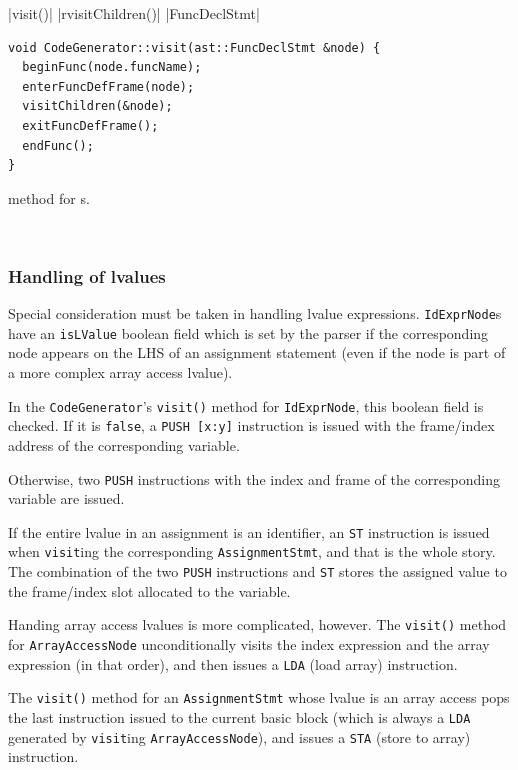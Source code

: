 \documentclass[11pt,a4paper]{scrartcl}
\begin{document}
|visit()|
|rvisitChildren()|
|FuncDeclStmt|
\begin{lstfloat}

\begin{verbatim}
void CodeGenerator::visit(ast::FuncDeclStmt &node) {
  beginFunc(node.funcName);
  enterFuncDefFrame(node);
  visitChildren(&node);
  exitFuncDefFrame();
  endFunc();
}
\end{verbatim}
  \caption{\protect{} method for \protect{}s.}~\label{lst:codegen-example-2}
\end{lstfloat}

\subsubsection{Handling of lvalues}

Special consideration must be taken in handling lvalue expressions. \verb|IdExprNode|s have an \verb|isLValue| boolean field which is set by the parser if the corresponding node appears on the LHS of an assignment statement (even if the node is part of a more complex array access lvalue).

In the \verb|CodeGenerator|'s \verb|visit()| method for \verb|IdExprNode|, this boolean field is checked. If it is \verb|false|, a \verb|PUSH [x:y]| instruction is issued with the frame/index address of the corresponding variable.

Otherwise, two \verb|PUSH| instructions with the index and frame of the corresponding variable are issued.

If the entire lvalue in an assignment is an identifier, an \verb|ST| instruction is issued when \verb|visit|ing the corresponding \verb|AssignmentStmt|, and that is the whole story. The combination of the two \verb|PUSH| instructions and \verb|ST| stores the assigned value to the frame/index slot allocated to the variable.

Handing array access lvalues is more complicated, however. The \verb|visit()| method for \verb|ArrayAccessNode| unconditionally visits the index expression and the array expression (in that order), and then issues a \verb|LDA| (load array) instruction.

The \verb|visit()| method for an \verb|AssignmentStmt| whose lvalue is an array access pops the last instruction issued to the current basic block (which is always a \verb|LDA| generated by \verb|visit|ing \verb|ArrayAccessNode|), and issues a \verb|STA| (store to array) instruction.
\end{document}
